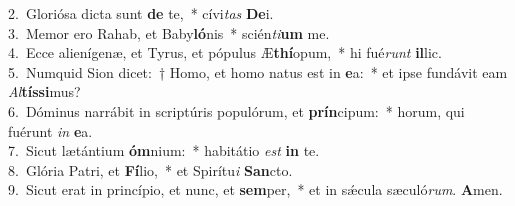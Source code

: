 {2.~}Gloriósa dicta sunt \textbf{de} te,~* cívi\textit{tas} \textbf{De}i.\\
{3.~}Memor ero Rahab, et Baby\textbf{ló}nis~* scién\textit{ti}\textbf{um} me.\\
{4.~}Ecce alienígenæ, et Tyrus, et pópulus Æ\textbf{thí}opum,~* hi fué\textit{runt} \textbf{il}lic.\\
{5.~}Numquid Sion dicet:~† Homo, et homo natus est in \textbf{e}a:~* et ipse fundávit eam \textit{Al}\textbf{tís}\textbf{si}mus?\\
{6.~}Dóminus narrábit in scriptúris populórum, et \textbf{prín}cipum:~* horum, qui fuérunt \textit{in} \textbf{e}a.\\
{7.~}Sicut lætántium \textbf{óm}nium:~* habitátio \textit{est} \textbf{in} te.\\
{8.~}Glória Patri, et \textbf{Fí}lio,~* et Spirítu\textit{i} \textbf{San}cto.\\
{9.~}Sicut erat in princípio, et nunc, et \textbf{sem}per,~* et in sǽcula sæculó\textit{rum}. \textbf{A}men.\\
